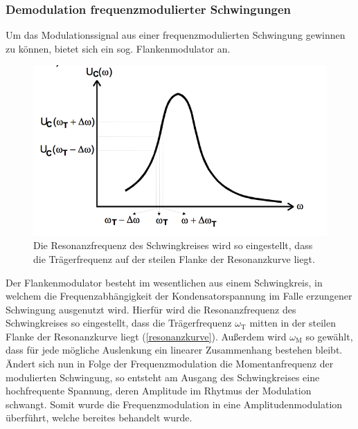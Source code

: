 \subsubsection{Demodulation frequenzmodulierter Schwingungen}
Um das Modulationssignal aus einer frequenzmodulierten Schwingung gewinnen zu können, bietet sich ein sog. Flankenmodulator an.

\begin{figure}
	\centering
	\includegraphics[width=\textwidth]{img/Abb13.png}
	\caption{Die Resonanzfrequenz des Schwingkreises wird so eingestellt, dass die Trägerfrequenz auf der steilen Flanke der Resonanzkurve liegt. \cite{FP}}
	\label{resonanzkurve}
\end{figure}

Der Flankenmodulator besteht im wesentlichen aus einem Schwingkreis, in welchem die Frequenzabhängigkeit der Kondensatorspannung im Falle erzungener Schwingung ausgenutzt wird. Hierfür wird die Resonanzfrequenz des Schwingkreises so eingestellt, dass die Trägerfrequenz $\omega_\text{T}$ mitten in der steilen Flanke der Resonanzkurve liegt (\autoref{resonanzkurve}). Außerdem wird $\omega_\text{M}$ so gewählt, dass für jede mögliche Auslenkung ein linearer Zusammenhang bestehen bleibt. Ändert sich nun in Folge der Frequenzmodulation die Momentanfrequenz der modulierten Schwingung, so entsteht am Ausgang des Schwingkreises eine hochfrequente Spannung, deren Amplitude im Rhytmus der Modulation schwangt. Somit wurde die Frequenzmodulation in eine Amplitudenmodulation überführt, welche bereites behandelt wurde.
